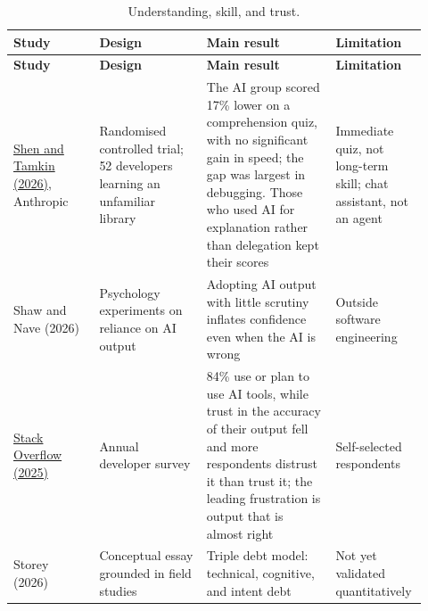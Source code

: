 \documentclass[11pt]{article}
\begin{document}
\small
\begin{longtable}{p{0.2\linewidth}p{0.25\linewidth}p{0.3\linewidth}p{0.17\linewidth}}
\caption{Understanding, skill, and trust.}\\
\toprule
\textbf{Study} & \textbf{Design} & \textbf{Main result} & \textbf{Limitation} \\
\midrule
\endfirsthead
\toprule
\textbf{Study} & \textbf{Design} & \textbf{Main result} & \textbf{Limitation} \\
\midrule
\endhead
\href{https://www.anthropic.com/research/AI-assistance-coding-skills}{Shen and Tamkin (2026)}, Anthropic & Randomised controlled trial; 52 developers learning an unfamiliar library & The AI group scored 17\% lower on a comprehension quiz, with no significant gain in speed; the gap was largest in debugging. Those who used AI for explanation rather than delegation kept their scores & Immediate quiz, not long-term skill; chat assistant, not an agent \\
Shaw and Nave (2026) & Psychology experiments on reliance on AI output & Adopting AI output with little scrutiny inflates confidence even when the AI is wrong & Outside software engineering \\
\href{https://stackoverflow.blog/2025/12/29/developers-remain-willing-but-reluctant-to-use-ai-the-2025-developer-survey-results-are-here/}{Stack Overflow (2025)} & Annual developer survey & 84\% use or plan to use AI tools, while trust in the accuracy of their output fell and more respondents distrust it than trust it; the leading frustration is output that is almost right & Self-selected respondents \\
Storey (2026) & Conceptual essay grounded in field studies & Triple debt model: technical, cognitive, and intent debt & Not yet validated quantitatively \\
\bottomrule
\end{longtable}
\normalsize
\end{document}
